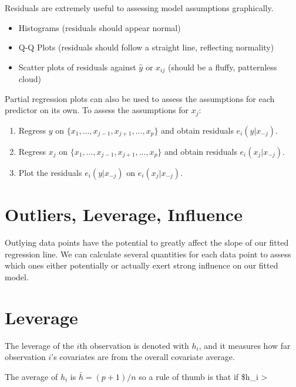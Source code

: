 \documentclass[
  letterpaper,
  DIV=11,
  numbers=noendperiod]{scrreport}
\providecommand{\tightlist}{%
  \setlength{\itemsep}{0pt}\setlength{\parskip}{0pt}}\usepackage{longtable,booktabs,array}
\begin{document}
Residuals are extremely useful to assessing model assumptions
graphically.

\begin{itemize}
\tightlist
\item
  Histograms (residuals should appear normal)
\item
  Q-Q Plots (residuals should follow a straight line, reflecting
  normality)
\item
  Scatter plots of residuals against \(\hat y\) or \(x_{ij}\) (should be
  a fluffy, patternless cloud)
\end{itemize}

Partial regression plots can also be used to assess the assumptions for
each predictor on its own. To assess the assumptions for \(x_{j}\):

\begin{enumerate}
\def\labelenumi{\arabic{enumi}.}
\tightlist
\item
  Regress \(y\) on \(\{ x_1, ..., x_{j-1}, x_{j+1}, ..., x_p \}\) and
  obtain residuals \(e_i(y|x_{-j})\).
\item
  Regress \(x_j\) on \(\{x_1, ..., x_{j-1}, x_{j+1}, ..., x_p \}\) and
  obtain residuals \(e_i(x_j|x_{-j})\).
\item
  Plot the residuals \(e_i(y|x_{-j})\) on \(e_i(x_j|x_{-j})\).
\end{enumerate}

\hypertarget{outliers-leverage-influence}{%
\section{Outliers, Leverage,
Influence}\label{outliers-leverage-influence}}

Outlying data points have the potential to greatly affect the slope of
our fitted regression line. We can calculate several quantities for each
data point to assess which ones either potentially or actually exert
strong influence on our fitted model.

\hypertarget{leverage}{%
\section{Leverage}\label{leverage}}

The {leverage} of the \(i\)th observation is denoted with \(h_i\), and
it measures how far observation \(i\)'s covariates are from the overall
covariate average.

The average of \(h_i\) is \(\bar h = (p+1)/n\) so a rule of thumb is
that if \$h\_i \textgreater{} 
\end{document}
